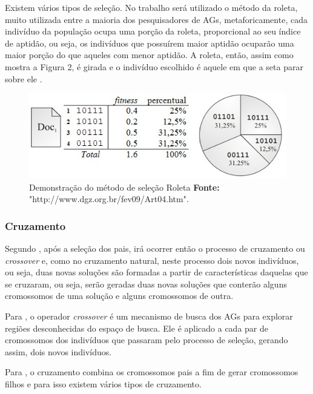 \par Existem vários tipos de seleção. No trabalho será utilizado o método da
roleta, muito utilizada entre a maioria dos
pesquisadores de AGs, metaforicamente, cada indivíduo da população ocupa uma
porção da roleta, proporcional ao seu índice de aptidão, ou seja, os indivíduos
que possuírem maior aptidão ocuparão uma maior porção do que aqueles com menor
aptidão. A roleta, então, assim como mostra a Figura 2, é girada e o indivíduo
escolhido é aquele em que a seta parar sobre ele \cite{REVISTA_MULTIDISCIPLINAR_DA_UNIESP}.


\begin{figure}[h!]
	\centerline{\includegraphics[scale=1.0]{./imagens/roleta.jpg}}
	\caption[Demonstração do método de seleção Roleta]
	{Demonstração do método de seleção Roleta \textbf{Fonte:}
	"http://www.dgz.org.br/fev09/Art04.htm".}
	\label{fig:exemplo2}
\end{figure}

\subsubsection{Cruzamento} 

\par Segundo , após a seleção dos pais, irá
ocorrer então o processo de cruzamento ou \textit{crossover} e, como no cruzamento natural, neste processo dois novos indivíduos, ou seja, duas
novas soluções são formadas a partir de características daquelas que se
cruzaram, ou seja, serão geradas duas novas soluções que conterão alguns cromossomos
de uma solução e alguns cromossomos de outra.

\par Para , o operador
\textit{crossover} é um mecanismo de busca dos AGs para explorar regiões
desconhecidas do espaço de busca. Ele é aplicado a cada par de cromossomos dos
indivíduos que passaram pelo processo de seleção, gerando assim, dois novos
indivíduos.

\par Para , o cruzamento combina
os cromossomos pais a fim de gerar cromossomos filhos e para isso existem vários
tipos de cruzamento.

